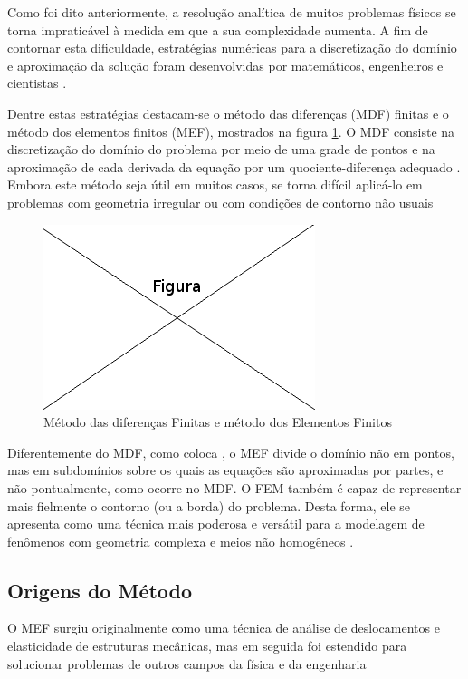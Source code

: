\documentclass[
    12pt,               %
    openright,          %
    oneside,
    a4paper,            %
    english,            %
    french,             %
    spanish,            %
    brazil              %
    ]{abntex2}
\begin{document}
Como foi dito anteriormente, a resolução analítica de muitos problemas físicos se torna impraticável à medida em que a sua  complexidade aumenta. 
A fim de contornar esta dificuldade, estratégias numéricas para a discretização do domínio e aproximação da solução foram desenvolvidas por matemáticos, engenheiros e cientistas \cite[p. 1]{zien}. 

Dentre estas estratégias destacam-se o método das diferenças (MDF) finitas e o método dos elementos finitos (MEF), mostrados na figura \ref{fig:mdfFem}. O MDF consiste na discretização do domínio do problema por meio de uma grade de pontos e na aproximação de cada derivada da equação por um quociente-diferença adequado
\cite[p. 684]{burden_faires}. Embora este método seja útil em muitos casos, se torna difícil aplicá-lo em problemas com geometria irregular ou com condições de contorno não usuais \cite[p. 4]{huebner}

\begin{figure}[!htb]
\centering
\includegraphics[scale=0.5]{figuras/temp.png}
\caption{Método das diferenças Finitas e método dos Elementos Finitos}
\label{fig:mdfFem}
\end{figure}

Diferentemente do MDF, como coloca \cite[p. 4]{huebner}, o MEF divide o domínio não em pontos, mas em subdomínios sobre os quais as equações são aproximadas por partes, e não pontualmente, como ocorre no MDF. O FEM também é capaz de representar mais fielmente o contorno (ou a borda) do problema. Desta forma, ele se apresenta como uma técnica mais poderosa e versátil para a modelagem de fenômenos com geometria complexa e meios não homogêneos \cite[p. 390]{sadiku}. 


\subsection{Origens do Método}

O MEF surgiu originalmente como uma técnica de análise de deslocamentos e elasticidade de estruturas mecânicas, mas em seguida foi estendido para solucionar problemas de outros campos da física e da engenharia \cite[p. 19]{jin} \cite[p. 3]{desai} \cite[p. 2]{zien}
\end{document}
